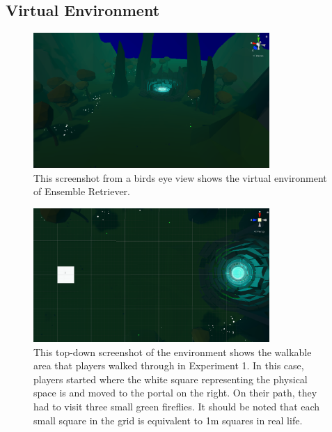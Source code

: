 \subsection{Virtual Environment}
\begin{figure}[tbph]
    \centering
    \includegraphics[width=0.8\textwidth]{figures/screenshots/EnvironmentKindaLowRes.png}
    \caption[Screenshot of the Environment in Ensemble Retriever]{This screenshot from a birds eye view shows the virtual environment of Ensemble Retriever.}
    \label{fig:ensembleRetrieverEnvironment}
\end{figure}

\begin{figure}[tbph]
    \centering
    \includegraphics[width=0.8\textwidth]{figures/screenshots/TopDownExperiment1Spawn.png}
    \caption[Top Down Screenshot of Virtual Space That Players Walked Through]{This top-down screenshot of the environment shows the walkable area that players walked through in Experiment 1. In this case, players started where the white square representing the physical space is and moved to the portal on the right. On their path, they had to visit three small green fireflies. It should be noted that each small square in the grid is equivalent to 1m squares in real life.}
    \label{fig:topDownViewOfEnvironment}
\end{figure}

